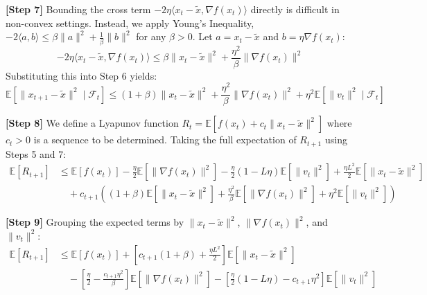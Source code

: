 \documentclass[11pt]{article}
\begin{document}
\textbf{[Step 7]} Bounding the cross term $-2\eta \langle x_t - \tilde{x}, \nabla f(x_t) \rangle$ directly is difficult in non-convex settings. Instead, we apply Young's Inequality, $-2\langle a, b \rangle \le \beta \|a\|^2 + \frac{1}{\beta} \|b\|^2$ for any $\beta > 0$. Let $a = x_t - \tilde{x}$ and $b = \eta \nabla f(x_t)$:
\begin{equation*}
    -2\eta \langle x_t - \tilde{x}, \nabla f(x_t) \rangle \le \beta \|x_t - \tilde{x}\|^2 + \frac{\eta^2}{\beta} \|\nabla f(x_t)\|^2
\end{equation*}
Substituting this into Step 6 yields:
\begin{equation} \tag{Step 7}
    \mathbb{E}[\|x_{t+1} - \tilde{x}\|^2 \mid \mathcal{F}_t] \le (1 + \beta) \|x_t - \tilde{x}\|^2 + \frac{\eta^2}{\beta} \|\nabla f(x_t)\|^2 + \eta^2 \mathbb{E}[\|v_t\|^2 \mid \mathcal{F}_t]
\end{equation}

\textbf{[Step 8]} We define a Lyapunov function $R_t = \mathbb{E}[f(x_t) + c_t \|x_t - \tilde{x}\|^2]$ where $c_t > 0$ is a sequence to be determined. Taking the full expectation of $R_{t+1}$ using Steps 5 and 7:
\begin{align} 
    \mathbb{E}[R_{t+1}] &\le \mathbb{E}[f(x_t)] - \frac{\eta}{2} \mathbb{E}[\|\nabla f(x_t)\|^2] - \frac{\eta}{2}(1 - L\eta) \mathbb{E}[\|v_t\|^2] + \frac{\eta L^2}{2} \mathbb{E}[\|x_t - \tilde{x}\|^2] \nonumber \\
    &\quad + c_{t+1} \left( (1 + \beta) \mathbb{E}[\|x_t - \tilde{x}\|^2] + \frac{\eta^2}{\beta} \mathbb{E}[\|\nabla f(x_t)\|^2] + \eta^2 \mathbb{E}[\|v_t\|^2] \right) \tag{Step 8}
\end{align}

\textbf{[Step 9]} Grouping the expected terms by $\|x_t - \tilde{x}\|^2$, $\|\nabla f(x_t)\|^2$, and $\|v_t\|^2$:
\begin{align} 
    \mathbb{E}[R_{t+1}] &\le \mathbb{E}[f(x_t)] + \left[ c_{t+1}(1 + \beta) + \frac{\eta L^2}{2} \right] \mathbb{E}[\|x_t - \tilde{x}\|^2] \nonumber \\
    &\quad - \left[ \frac{\eta}{2} - \frac{c_{t+1}\eta^2}{\beta} \right] \mathbb{E}[\|\nabla f(x_t)\|^2] - \left[ \frac{\eta}{2}(1 - L\eta) - c_{t+1}\eta^2 \right] \mathbb{E}[\|v_t\|^2] \tag{Step 9}
\end{align}
\end{document}
